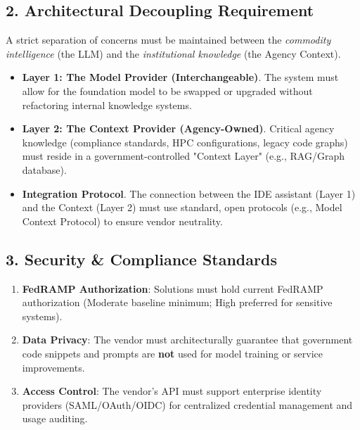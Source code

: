 \documentclass[10pt]{article}
\begin{document}
\subsection*{2. Architectural Decoupling Requirement}
A strict separation of concerns must be maintained between the \textit{commodity intelligence} (the LLM) and the \textit{institutional knowledge} (the Agency Context).

\begin{itemize}[leftmargin=*, itemsep=3pt, topsep=3pt]
    \item \textbf{Layer 1: The Model Provider (Interchangeable)}. The system must allow for the foundation model to be swapped or upgraded without refactoring internal knowledge systems.
    \item \textbf{Layer 2: The Context Provider (Agency-Owned)}. Critical agency knowledge (compliance standards, HPC configurations, legacy code graphs) must reside in a government-controlled "Context Layer" (e.g., RAG/Graph database).
    \item \textbf{Integration Protocol}. The connection between the IDE assistant (Layer 1) and the Context (Layer 2) must use standard, open protocols (e.g., Model Context Protocol) to ensure vendor neutrality.
\end{itemize}

\subsection*{3. Security \& Compliance Standards}
\begin{enumerate}[leftmargin=*, itemsep=2pt, topsep=3pt]
    \item \textbf{FedRAMP Authorization}: Solutions must hold current FedRAMP authorization (Moderate baseline minimum; High preferred for sensitive systems).
    \item \textbf{Data Privacy}: The vendor must architecturally guarantee that government code snippets and prompts are \textbf{not} used for model training or service improvements.
    \item \textbf{Access Control}: The vendor's API must support enterprise identity providers (SAML/OAuth/OIDC) for centralized credential management and usage auditing.
\end{enumerate}

\newpage

\end{document}
